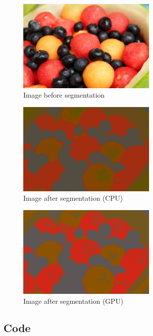 \documentclass[11pt]{article}
\begin{document}
\begin{figure}[ht]
    \centering
    \includegraphics[width=0.6\textwidth]{fruit.png}
    \caption{Image\cite{fruit} before segmentation}
    \label{fig:fruit}
\end{figure}


\begin{figure}[ht]
    \centering
    \includegraphics[width=0.6\textwidth]{fruit-segmented-cpu.png}
    \caption{Image after segmentation (CPU)}
    \label{fig:fruit-segmented-cpu}
\end{figure}


\begin{figure}[ht]
    \centering
    \includegraphics[width=0.6\textwidth]{fruit-segmented-gpu.png}
    \caption{Image after segmentation (GPU)}
    \label{fig:fruit-segmented-gpu}
\end{figure}




\subsection{Code}
\end{document}
